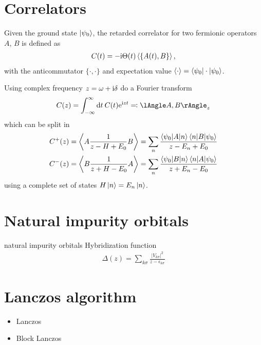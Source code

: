 \section{Correlators}

Given the ground state $\ket{\psi_0}$,
the retarded correlator for two fermionic operators $A$, $B$ is defined as
\begin{align}
    C(t) = -\mathrm{i} \Theta(t) \braket{\{A(t), B\}},
\end{align}
with the anticommutator $\{\cdot,\cdot\}$
and expectation value $\braket{\cdot} = \braket{\psi_0 | \cdot | \psi_0}$.

Using complex frequency $z = \omega + \mathrm{i} \delta$ do a Fourier transform
\begin{equation}
    C(z) = \int_{-\infty}^\infty \md t\>C(t) \me^{\mi zt} \eqqcolon \lAngle A, B \rAngle_z
\end{equation}
which can be split in
\begin{subequations}
    \begin{align}
        C^+(z)
         & =
        \Braket{A \frac{1}{z - H + E_0} B}
        =
        \sum_n \frac{\braket{\psi_0 | A | n}\braket{n | B | \psi_0}}{z - E_n + E_0}
        \\
        C^-(z)
         & =
        \Braket{B \frac{1}{z + H - E_0} A}
        =
        \sum_n \frac{\braket{\psi_0 | B | n}\braket{n | A | \psi_0}}{z + E_n - E_0}
    \end{align}
\end{subequations}
using a complete set of states $H\ket{n} = E_n\ket{n}$.

\section{Natural impurity orbitals}

natural impurity orbitals
Hybridization function
\begin{align}
    \Delta(z) = \sum_{k\sigma} \frac{|V_{k\sigma}|^2}{z - \epsilon_{k\sigma}}
\end{align}

\section{Lanczos algorithm}

\begin{itemize}
    \item Lanczos
    \item Block Lanczos
\end{itemize}

